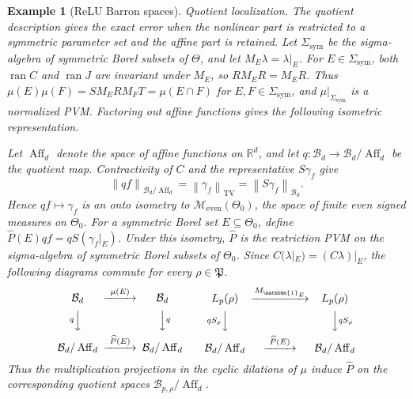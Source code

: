 \documentclass[11pt,leqno]{amsart}
\theoremstyle{compact}
\numberwithin{equation}{section}
\theoremstyle{compactremark}
\newtheorem{example}[theorem]{Example}
\theoremstyle{compact}
\newcommand{\1}{\mathbbm{1}}
\newcommand{\R}{\mathbb{R}}
\newcommand{\norm}[1]{\left\|#1\right\|}
\begin{document}
\begin{example}[ReLU Barron spaces]
\textit{Quotient localization.} The quotient description gives the exact error when the nonlinear part is restricted to a symmetric parameter set and the affine part is retained.
\begingroup
Let $\Sigma_{\mathrm{sym}}$ be the sigma-algebra of symmetric Borel subsets of $\Theta$, and let $M_E\lambda=\lambda|_E$. For $E\in\Sigma_{\mathrm{sym}}$, both $\operatorname{ran}C$ and $\operatorname{ran}J$ are invariant under $M_E$, so $RM_ER=M_ER$. Thus $\mu(E)\mu(F)=SM_ERM_FT=\mu(E\cap F)$ for $E,F\in\Sigma_{\mathrm{sym}}$, and $\mu|_{\Sigma_{\mathrm{sym}}}$ is a normalized PVM. Factoring out affine functions gives the following isometric representation.
\par\endgroup
Let $\operatorname{Aff}_d$ denote the space of affine functions on $\R^d$, and let $q\colon\mathcal B_d\to\mathcal B_d/\operatorname{Aff}_d$ be the quotient map. Contractivity of $C$ and the representative $S\gamma_f$ give
\begin{equation}\label{eq:barron-even-isometry}
\norm{qf}_{\mathcal B_d/\operatorname{Aff}_d}
=\norm{\gamma_f}_{\mathrm{TV}}
=\norm{S\gamma_f}_{\mathcal B_d}.
\end{equation}
Hence $qf\mapsto\gamma_f$ is an onto isometry to $\mathcal M_{\mathrm{even}}(\Theta_0)$, the space of finite even signed measures on $\Theta_0$. For a symmetric Borel set $E\subseteq\Theta_0$, define $\widehat P(E)qf=qS(\gamma_f|_E)$. Under this isometry, $\widehat P$ is the restriction PVM on the sigma-algebra of symmetric Borel subsets of $\Theta_0$.
\begingroup
Since $C(\lambda|_E)=(C\lambda)|_E$, the following diagrams commute for every $\rho\in\mathfrak P$.
\begin{equation}\label{eq:barron-quotient-dilation}
\begin{CD}
    \mathcal B_d @>{\mu(E)}>> \mathcal B_d\\
    @V{q}VV @VV{q}V\\
    \mathcal B_d/\operatorname{Aff}_d @>{\widehat P(E)}>> \mathcal B_d/\operatorname{Aff}_d
\end{CD}
\qquad
\begin{CD}
    L_p(\rho) @>{M_{\1_E}}>> L_p(\rho)\\
    @V{qS_\rho}VV @VV{qS_\rho}V\\
    \mathcal B_d/\operatorname{Aff}_d @>{\widehat P(E)}>> \mathcal B_d/\operatorname{Aff}_d
\end{CD}
\end{equation}
\endgroup
Thus the multiplication projections in the cyclic dilations of $\mu$ induce $\widehat P$ on the corresponding quotient spaces $\mathcal B_{p,\rho}/\operatorname{Aff}_d$.

\end{example}
\end{document}

